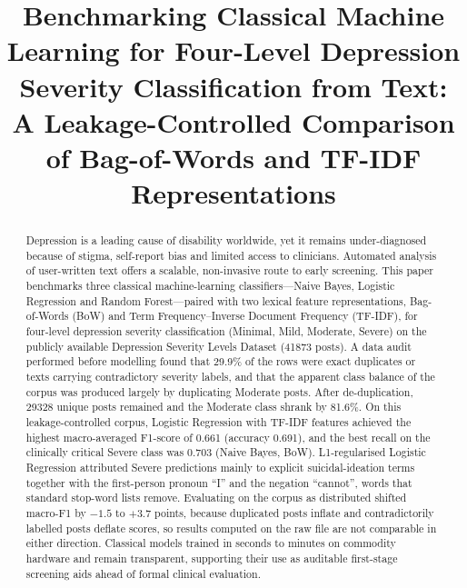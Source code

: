 \documentclass[conference]{IEEEtran}
\begin{document}
\title{Benchmarking Classical Machine Learning for Four-Level Depression Severity Classification from Text: A Leakage-Controlled Comparison of Bag-of-Words and TF-IDF Representations}

\author{
}

\maketitle

\begin{abstract}
Depression is a leading cause of disability worldwide, yet it remains under-diagnosed because of stigma, self-report bias and limited access to clinicians. Automated analysis of user-written text offers a scalable, non-invasive route to early screening. This paper benchmarks three classical machine-learning classifiers---Naive Bayes, Logistic Regression and Random Forest---paired with two lexical feature representations, Bag-of-Words (BoW) and Term Frequency--Inverse Document Frequency (TF-IDF), for four-level depression severity classification (Minimal, Mild, Moderate, Severe) on the publicly available Depression Severity Levels Dataset (\num{41873} posts). A data audit performed before modelling found that 29.9\% of the rows were exact duplicates or texts carrying contradictory severity labels, and that the apparent class balance of the corpus was produced largely by duplicating Moderate posts. After de-duplication, \num{29328} unique posts remained and the Moderate class shrank by 81.6\%. On this leakage-controlled corpus, Logistic Regression with TF-IDF features achieved the highest macro-averaged F1-score of 0.661 (accuracy 0.691), and the best recall on the clinically critical Severe class was 0.703 (Naive Bayes, BoW). L1-regularised Logistic Regression attributed Severe predictions mainly to explicit suicidal-ideation terms together with the first-person pronoun ``I'' and the negation ``cannot'', words that standard stop-word lists remove. Evaluating on the corpus as distributed shifted macro-F1 by $-1.5$ to $+3.7$ points, because duplicated posts inflate and contradictorily labelled posts deflate scores, so results computed on the raw file are not comparable in either direction. Classical models trained in seconds to minutes on commodity hardware and remain transparent, supporting their use as auditable first-stage screening aids ahead of formal clinical evaluation.
\end{abstract}
\end{document}

